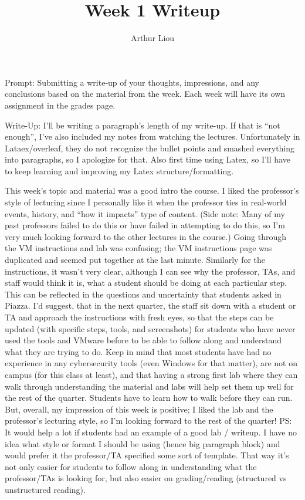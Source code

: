 \documentclass[12pt]{article}
\begin{document}
 
 
\title{Week 1 Writeup}
\author{Arthur Liou}

\maketitle

Prompt: Submitting a write-up of your thoughts, impressions, and any conclusions based on the material from the week. Each week will have its own assignment in the grades page.

Write-Up: I’ll be writing a paragraph’s length of my write-up. If that is “not enough”, I’ve also included my notes from watching the lectures. Unfortunately in Lataex/overleaf, they do not recognize the bullet points and smashed everything into paragraphs, so I apologize for that. Also first time using Latex, so I'll have to keep learning and improving my Latex structure/formatting.


	This week’s topic and material was a good intro the course. I liked the professor’s style of lecturing since I personally like it when the professor ties in real-world events, history, and “how it impacts” type of content. (Side note: Many of my past professors failed to do this or have failed in attempting to do this, so I’m very much looking forward to the other lectures in the course.) Going through the VM instructions and lab was confusing; the VM instructions page was duplicated and seemed put together at the last minute. Similarly for the instructions, it wasn’t very clear, although I can see why the professor, TAs, and staff would think it is, what a student should be doing at each particular step. This can be reflected in the questions and uncertainty that students asked in Piazza. I’d suggest, that in the next quarter, the staff sit down with a student or TA and approach the instructions with fresh eyes, so that the steps can be updated (with specific steps, tools, and screenshots) for students who have never used the tools and VMware before to be able to follow along and understand what they are trying to do. Keep in mind that most students have had no experience in any cybersecurity tools (even Windows for that matter), are not on campus (for this class at least), and that having a strong first lab where they can walk through understanding the material and labs will help set them up well for the rest of the quarter. Students have to learn how to walk before they can run. But, overall, my impression of this week is positive; I liked the lab and the professor’s lecturing style, so I’m looking forward to the rest of the quarter! 
	PS: It would help a lot if students had an example of a good lab / writeup. I have no idea what style or format I should be using (hence big paragraph block) and would prefer it the professor/TA specified some sort of template. That way it’s not only easier for students to follow along in understanding what the professor/TAs is looking for, but also easier on grading/reading (structured vs unstructured reading). 
\end{document}

